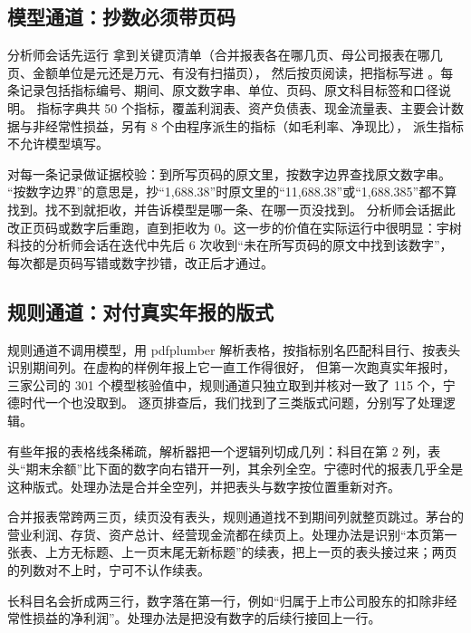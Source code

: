 \subsection{模型通道：抄数必须带页码}

分析师会话先运行  拿到关键页清单（合并报表各在哪几页、母公司报表在哪几页、金额单位是元还是万元、有没有扫描页），
然后按页阅读，把指标写进 。每条记录包括指标编号、期间、原文数字串、单位、页码、原文科目标签和口径说明。
指标字典共 50 个指标，覆盖利润表、资产负债表、现金流量表、主要会计数据与非经常性损益，另有 8 个由程序派生的指标（如毛利率、净现比），
派生指标不允许模型填写。

 对每一条记录做证据校验：到所写页码的原文里，按数字边界查找原文数字串。
“按数字边界”的意思是，抄“1,688.38”时原文里的“11,688.38”或“1,688.385”都不算找到。找不到就拒收，并告诉模型是哪一条、在哪一页没找到。
分析师会话据此改正页码或数字后重跑，直到拒收为 0。这一步的价值在实际运行中很明显：宇树科技的分析师会话在迭代中先后 6 次收到“未在所写页码的原文中找到该数字”，
每次都是页码写错或数字抄错，改正后才通过。

\subsection{规则通道：对付真实年报的版式}

规则通道不调用模型，用 pdfplumber 解析表格，按指标别名匹配科目行、按表头识别期间列。在虚构的样例年报上它一直工作得很好，
但第一次跑真实年报时，三家公司的 301 个模型核验值中，规则通道只独立取到并核对一致了 115 个，宁德时代一个也没取到。
逐页排查后，我们找到了三类版式问题，分别写了处理逻辑。

\begin{description}[leftmargin=0pt,labelsep=0.5em,font=\heiti\bfseries\color{ink}]
  \item[稀疏网格] 有些年报的表格线条稀疏，解析器把一个逻辑列切成几列：科目在第 2 列，表头“期末余额”比下面的数字向右错开一列，其余列全空。宁德时代的报表几乎全是这种版式。处理办法是合并全空列，并把表头与数字按位置重新对齐。
  \item[跨页续表] 合并报表常跨两三页，续页没有表头，规则通道找不到期间列就整页跳过。茅台的营业利润、存货、资产总计、经营现金流都在续页上。处理办法是识别“本页第一张表、上方无标题、上一页末尾无新标题”的续表，把上一页的表头接过来；两页的列数对不上时，宁可不认作续表。
  \item[科目折行] 长科目名会折成两三行，数字落在第一行，例如“归属于上市公司股东的扣除非经常性损益的净利润”。处理办法是把没有数字的后续行接回上一行。
\end{description}

